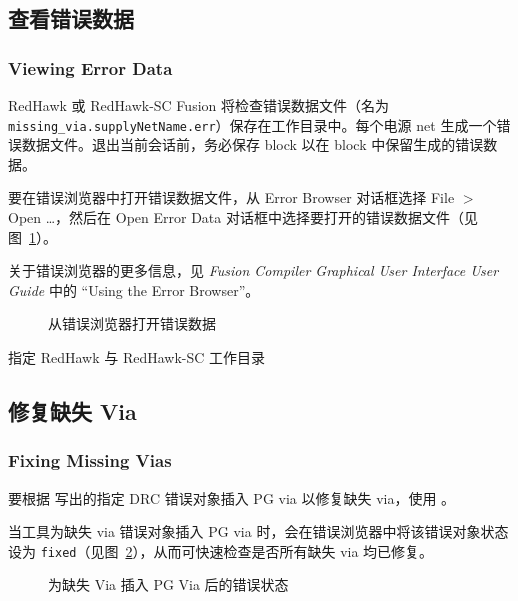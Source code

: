 \subsection{查看错误数据}
\subsubsection*{Viewing Error Data}

RedHawk 或 RedHawk-SC Fusion 将检查错误数据文件（名为 \texttt{missing\_via.supplyNetName.err}）保存在工作目录中。每个电源 net 生成一个错误数据文件。退出当前会话前，务必保存 block 以在 block 中保留生成的错误数据。

要在错误浏览器中打开错误数据文件，从 Error Browser 对话框选择 File $>$ Open \ldots，然后在 Open Error Data 对话框中选择要打开的错误数据文件（见图~\ref{fig:err-browser-open}）。

关于错误浏览器的更多信息，见 \textit{Fusion Compiler Graphical User Interface User Guide} 中的 ``Using the Error Browser''。

\begin{figure}[htbp]
\centering
{}
\caption{从错误浏览器打开错误数据}
\label{fig:err-browser-open}
\end{figure}

\begin{seeAlsoBox}
指定 RedHawk 与 RedHawk-SC 工作目录
\end{seeAlsoBox}

\subsection{修复缺失 Via}
\subsubsection*{Fixing Missing Vias}

要根据  写出的指定 DRC 错误对象插入 PG via 以修复缺失 via，使用 。

当工具为缺失 via 错误对象插入 PG via 时，会在错误浏览器中将该错误对象状态设为 \texttt{fixed}（见图~\ref{fig:fix-via-status}），从而可快速检查是否所有缺失 via 均已修复。

\begin{figure}[htbp]
\centering
{}
\caption{为缺失 Via 插入 PG Via 后的错误状态}
\label{fig:fix-via-status}
\end{figure}

